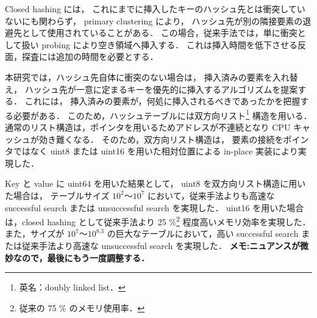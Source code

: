 Closed hashing には，
これにまでに挿入したキーのハッシュ先とは衝突していないにも関わらず，
primary clustering により，
ハッシュ先が別の隣接要素の退避先として使用されていることがある．
この場合，従来手法では，単に衝突として扱い probing により空き領域へ挿入する．
これは挿入時間を低下させる反面，探査には追加の時間を必要とする．

本研究では，ハッシュ先自体に衝突のない場合は，
挿入済みの要素を入れ替え，
ハッシュ先が一意に定まるキーを優先的に挿入するアルゴリズムを提案する．
これには，
挿入済みの要素が，何処に挿入されるべきであったかを把握する必要がある．
このため，ハッシュテーブルには双方向リスト\footnote{英名：doubly linked list．} 構造を用いる．
通常のリスト構造は，ポインタを用いるためアドレスが不連続となり CPU キャッシュが効き難くなる．
そのため，双方向リスト構造は，
要素の接続をポインタではなく uint8 または uint16 を用いた相対位置による in-place 実装により実現した．

Key と value に uint64 を用いた結果として，
uint8 を双方向リスト構造に用いた場合は，
テーブルサイズ $10^2〜10^{7}$ において，従来手法よりも高速な successful search または unsuccessful search を実現した．
uint16 を用いた場合は，closed hashing として従来手法より 25 \%\footnote{従来の 75 \% のメモリ使用率．} 程度高いメモリ効率を実現した．
また，サイズが $10^7〜10^{8.3}$ の巨大なテーブルにおいて，高い successful search または従来手法より高速な unsuccessful search を実現した．
{\bf \color{red}メモ:ニュアンスが微妙なので，最後にもう一度調整する．}






